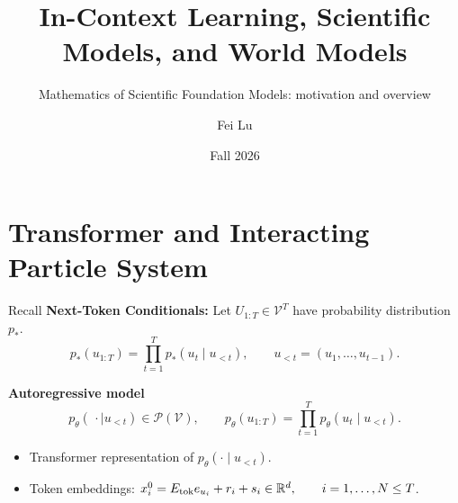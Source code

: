 \documentclass[aspectratio=169,11pt]{beamer}
\title{In-Context Learning, Scientific Models, and World Models}
\subtitle{Mathematics of Scientific Foundation Models: motivation and overview}
\author{Fei Lu}
\date{Fall 2026 }
\newcommand{\R}{\mathbb{R}}
\newcommand{\cP}{\mathcal{P}}
\begin{document}
\begin{frame}
  \titlepage
\end{frame}


\section{Transformer and Interacting Particle System}
\begin{frame}{Recall}
\textbf{Next-Token Conditionals: }
  Let $U_{1:T} \in \mathcal V^T$ have probability distribution $p_*$. 
\begin{equation*}
 p_*(u_{1:T})
 =\prod_{t=1}^T p_*(u_t\mid u_{<t}),
 \qquad u_{<t}=(u_1,\ldots,u_{t-1}).
\end{equation*}

\textbf{Autoregressive model}
\[
 p_\theta(\,\cdot\mid u_{<t})\in\cP(\mathcal V),
 \qquad
 p_\theta(u_{1:T})
 =\prod_{t=1}^T p_\theta(u_t\mid u_{<t}).
\]
\begin{itemize}
  \item Transformer representation of $p_\theta(\cdot\mid u_{<t})$.
  \item Token embeddings: $x_i^0=E_{\rm tok}e_{u_i}+r_i+s_i\in\R^d,
 \qquad i=1,\ldots,N\leq T$.
\end{itemize}
\end{frame}
\end{document}
